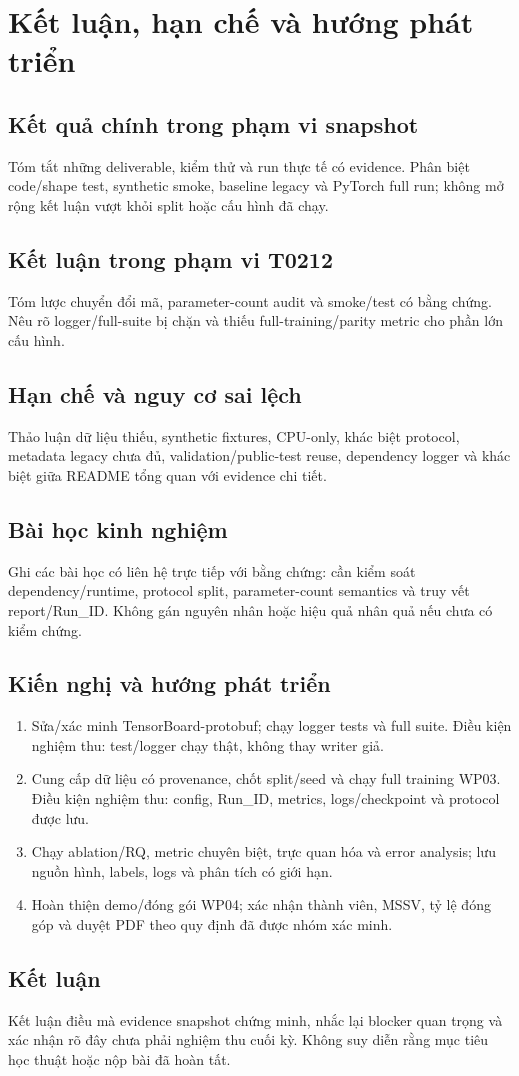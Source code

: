 \chapter{Kết luận, hạn chế và hướng phát triển}
\section{Kết quả chính trong phạm vi snapshot}
Tóm tắt những deliverable, kiểm thử và run thực tế có evidence. Phân biệt code/shape test, synthetic smoke, baseline legacy và PyTorch full run; không mở rộng kết luận vượt khỏi split hoặc cấu hình đã chạy.

\section{Kết luận trong phạm vi T0212}
Tóm lược chuyển đổi mã, parameter-count audit và smoke/test có bằng chứng. Nêu rõ logger/full-suite bị chặn và thiếu full-training/parity metric cho phần lớn cấu hình.

\section{Hạn chế và nguy cơ sai lệch}
Thảo luận dữ liệu thiếu, synthetic fixtures, CPU-only, khác biệt protocol, metadata legacy chưa đủ, validation/public-test reuse, dependency logger và khác biệt giữa README tổng quan với evidence chi tiết.

\section{Bài học kinh nghiệm}
Ghi các bài học có liên hệ trực tiếp với bằng chứng: cần kiểm soát dependency/runtime, protocol split, parameter-count semantics và truy vết report/Run_ID. Không gán nguyên nhân hoặc hiệu quả nhân quả nếu chưa có kiểm chứng.

\section{Kiến nghị và hướng phát triển}
\begin{enumerate}
\item Sửa/xác minh TensorBoard-protobuf; chạy logger tests và full suite. Điều kiện nghiệm thu: test/logger chạy thật, không thay writer giả.
\item Cung cấp dữ liệu có provenance, chốt split/seed và chạy full training WP03. Điều kiện nghiệm thu: config, Run_ID, metrics, logs/checkpoint và protocol được lưu.
\item Chạy ablation/RQ, metric chuyên biệt, trực quan hóa và error analysis; lưu nguồn hình, labels, logs và phân tích có giới hạn.
\item Hoàn thiện demo/đóng gói WP04; xác nhận thành viên, MSSV, tỷ lệ đóng góp và duyệt PDF theo quy định đã được nhóm xác minh.
\end{enumerate}

\section{Kết luận}
Kết luận điều mà evidence snapshot chứng minh, nhắc lại blocker quan trọng và xác nhận rõ đây chưa phải nghiệm thu cuối kỳ. Không suy diễn rằng mục tiêu học thuật hoặc nộp bài đã hoàn tất.